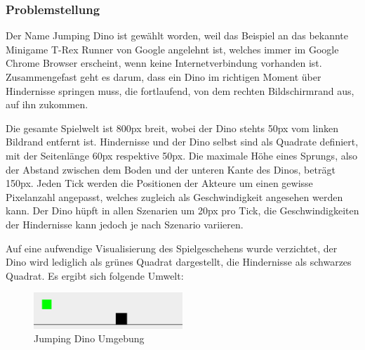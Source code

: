 \subsubsection{Problemstellung}
Der Name \glqq Jumping Dino\grqq{} ist gewählt worden, weil das Beispiel an das bekannte Minigame \glqq T-Rex Runner\grqq{} von Google angelehnt ist, welches immer im Google Chrome Browser erscheint, wenn keine Internetverbindung vorhanden ist. Zusammengefast geht es darum, dass ein Dino im richtigen Moment über Hindernisse springen muss, die fortlaufend, von dem rechten Bildschirmrand aus, auf ihn zukommen.
\par 
Die gesamte Spielwelt ist 800px breit, wobei der Dino stehts 50px vom linken Bildrand entfernt ist. Hindernisse und der Dino selbst sind als Quadrate definiert, mit der Seitenlänge 60px respektive 50px. Die maximale Höhe eines Sprungs, also der Abstand zwischen dem Boden und der unteren Kante des Dinos, beträgt 150px. Jeden Tick werden die Positionen der Akteure um einen gewisse Pixelanzahl angepasst, welches zugleich als Geschwindigkeit angesehen werden kann. Der Dino hüpft in allen Szenarien um 20px pro Tick, die Geschwindigkeiten der Hindernisse kann jedoch je nach Szenario variieren.
\par 
Auf eine aufwendige Visualisierung des Spielgeschehens wurde verzichtet, der Dino wird lediglich als grünes Quadrat dargestellt, die Hindernisse als schwarzes Quadrat. Es ergibt sich folgende Umwelt:
\begin{figure}[H]
    \begin{center}
    \includegraphics[width=0.5\textwidth]{images/jumpingDinoUmg.png}  \end{center}
    \caption{Jumping Dino Umgebung}
    \label{fig:jumpingDinoUmg}
\end{figure}

